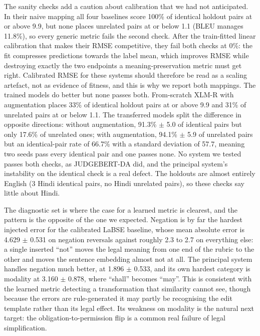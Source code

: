 \documentclass[conference]{IEEEtran}
\begin{document}
The sanity checks add a caution about calibration that we had not anticipated. In their naive mapping all four baselines score 100\% of identical holdout pairs at or above 9.9, but none places unrelated pairs at or below 1.1 (BLEU manages 11.8\%), so every generic metric fails the second check. After the train-fitted linear calibration that makes their RMSE competitive, they fail both checks at 0\%: the fit compresses predictions towards the label mean, which improves RMSE while destroying exactly the two endpoints a meaning-preservation metric must get right. Calibrated RMSE for these systems should therefore be read as a scaling artefact, not as evidence of fitness, and this is why we report both mappings. The trained models do better but none passes both. From-scratch XLM-R with augmentation places 33\% of identical holdout pairs at or above 9.9 and 31\% of unrelated pairs at or below 1.1. The transferred models split the difference in opposite directions: without augmentation, 91.3\% \ensuremath{\pm} 5.0 of identical pairs but only 17.6\% of unrelated ones; with augmentation, 94.1\% \ensuremath{\pm} 5.9 of unrelated pairs but an identical-pair rate of 66.7\% with a standard deviation of 57.7, meaning two seeds pass every identical pair and one passes none. No system we tested passes both checks, as JUDGEBERT-DA did, and the principal system's instability on the identical check is a real defect. The holdouts are almost entirely English (3 Hindi identical pairs, no Hindi unrelated pairs), so these checks say little about Hindi.

The diagnostic set is where the case for a learned metric is clearest, and the pattern is the opposite of the one we expected. Negation is by far the hardest injected error for the calibrated LaBSE baseline, whose mean absolute error is 4.629 \ensuremath{\pm} 0.531 on negation reversals against roughly 2.3 to 2.7 on everything else: a single inserted “not” moves the legal meaning from one end of the rubric to the other and moves the sentence embedding almost not at all. The principal system handles negation much better, at 1.896 \ensuremath{\pm} 0.533, and its own hardest category is modality at 3.160 \ensuremath{\pm} 0.878, where “shall” becomes “may”. This is consistent with the learned metric detecting a transformation that similarity cannot see, though because the errors are rule-generated it may partly be recognising the edit template rather than its legal effect. Its weakness on modality is the natural next target: the obligation-to-permission flip is a common real failure of legal simplification.
\end{document}
